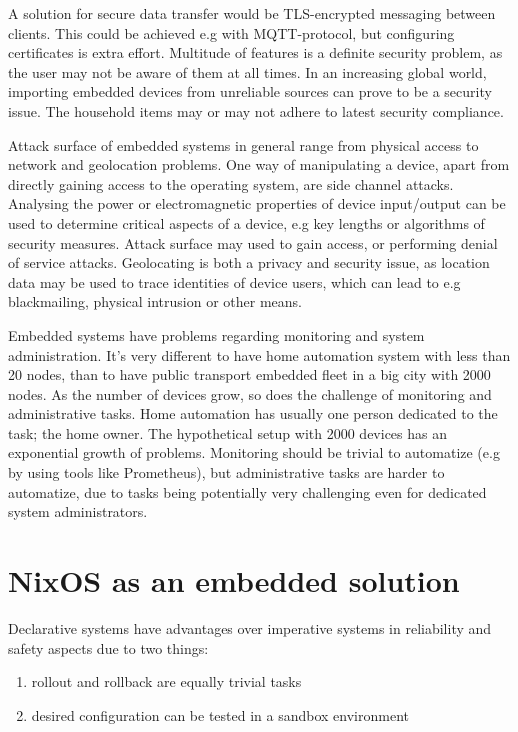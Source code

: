 A solution for secure data transfer would be TLS-encrypted messaging between clients. This could be achieved e.g with MQTT-protocol, but configuring certificates is extra effort. Multitude of features is a definite security problem, as the user may not be aware of them at all times. In an increasing global world, importing embedded devices from unreliable sources can prove to be a security issue. The household items may or may not adhere to latest security compliance. \cite{fysarakis2014embedded}

Attack surface of embedded systems in general range from physical access to network and geolocation problems. One way of manipulating a device, apart from directly gaining access to the operating system, are side channel attacks. Analysing the power or electromagnetic properties of device input/output can be used to determine critical aspects of a device, e.g key lengths or algorithms of security measures. Attack surface may used to gain access, or performing denial of service attacks. Geolocating is both a privacy and security issue, as location data may be used to trace identities of device users, which can lead to e.g blackmailing, physical intrusion or other means. \cite{fysarakis2014embedded}

Embedded systems have problems regarding monitoring and system administration. It's very different to have home automation system with less than 20 nodes, than to have public transport embedded fleet in a big city with 2000 nodes. As the number of devices grow, so does the challenge of monitoring and administrative tasks. Home automation has usually one person dedicated to the task; the home owner. The hypothetical setup with 2000 devices has an exponential growth of problems. Monitoring should be trivial to automatize (e.g by using tools like Prometheus), but administrative tasks are harder to automatize, due to tasks being potentially very challenging even for dedicated system administrators.


\section{NixOS as an embedded solution} \label{nixosassolution}

Declarative systems have advantages over imperative systems in reliability and safety aspects due to two things:

\begin{enumerate}

\item rollout and rollback are equally trivial tasks
\item desired configuration can be tested in a sandbox environment
  
\end{enumerate}

